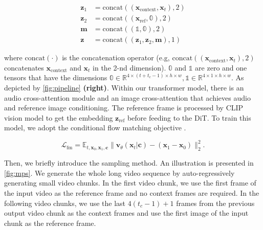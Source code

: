 \begin{equation}
\begin{aligned}
    \boldsymbol{z}_1 & = \mathrm{concat}((\boldsymbol{x}_{\mathrm{context}}, \boldsymbol{x}_t), 2) \\
    \boldsymbol{z}_2 & = \mathrm{concat}((\boldsymbol{x}_{\mathrm{ref}}, \mathbb{0}), 2) \\
    \boldsymbol{m}   & = \mathrm{concat}((\mathbb{1}, \mathbb{0}), 2) \\
    \boldsymbol{z}   & = \mathrm{concat}((\boldsymbol{z}_1, \boldsymbol{z}_2, \boldsymbol{m}), 1)
\end{aligned}
\end{equation}

where $\mathrm{concat}(\cdot)$ is the concatenation operator (e.g, $\mathrm{concat}((\boldsymbol{x}_{\mathrm{context}}, \boldsymbol{x}_t), 2)$ concatenates $\boldsymbol{x}_{\mathrm{context}}$ and $\boldsymbol{x}_t$ in the 2-nd dimension). $\mathbb{0}$ and $\mathbb{1}$ are zero and one tensors that have the dimensions $\mathbb{0} \in \mathbb{R}^{4 \times (t + t_c - 1) \times h \times w}, \mathbb{1} \in \mathbb{R}^{4 \times 1 \times h \times w}$. As depicted by \cref{fig:pipeline} \textbf{(right)}. Within our transformer model, there is an audio cross-attention module and an image cross-attention that achieves audio and reference image conditioning. The reference frame is processed by CLIP vision model \cite{openclip} to get the embedding $\boldsymbol{z}_{\mathrm{ref}}$ before feeding to the DiT. To train this model, we adopt the conditional flow matching objective \cite{flowmatching}.

\begin{equation}
    \mathcal{L}_{\mathrm{fm}} = \mathbb{E}_{t, \boldsymbol{x}_0, \boldsymbol{x}_1, \boldsymbol{c}} \|\boldsymbol{v}_\theta(\boldsymbol{x}_t \vert \boldsymbol{c}) - (\boldsymbol{x}_1 - \boldsymbol{x}_0)\|_2^2.
\end{equation}


Then, we briefly introduce the sampling method. An illustration is presented in \cref{fig:mps}. We generate the whole long video sequence by auto-regressively generating small video chunks. In the first video chunk, we use the first frame of the input video as the reference frame and no context frames are required. In the following video chunks, we use the last $4 (t_c - 1) + 1$ frames from the previous output video chunk as the context frames and use the first image of the input chunk as the reference frame.

